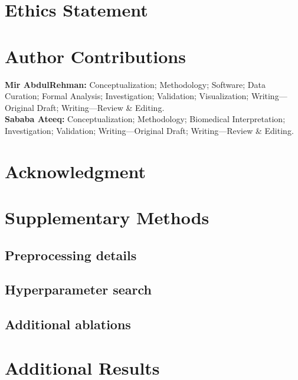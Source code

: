 \documentclass[10pt,journal]{IEEEtran}
\begin{document}
\section*{Ethics Statement}

\section*{Author Contributions}
\textbf{Mir AbdulRehman:} Conceptualization; Methodology; Software; Data Curation; Formal Analysis; Investigation; Validation; Visualization; Writing---Original Draft; Writing---Review \& Editing.\\
\textbf{Sababa Ateeq:} Conceptualization; Methodology; Biomedical Interpretation; Investigation; Validation; Writing---Original Draft; Writing---Review \& Editing.\\

\section*{Acknowledgment}




\appendices
\section{Supplementary Methods}
\subsection{Preprocessing details}
\subsection{Hyperparameter search}
\subsection{Additional ablations}

\section{Additional Results}
\end{document}
